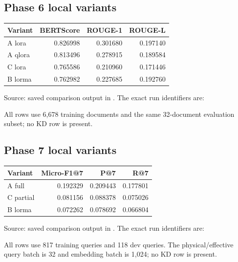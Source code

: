 \subsection{Phase 6 local variants}
\begin{table}[H]\centering\small
\begin{tabular}{lrrr}
\toprule Variant & BERTScore & ROUGE-1 & ROUGE-L\\\midrule
A lora & 0.826998 & 0.301680 & 0.197140\\
A qlora & 0.813496 & 0.278915 & 0.189584\\
C lora & 0.765586 & 0.210960 & 0.171446\\
B lorma & 0.762982 & 0.227685 & 0.192760\\
\bottomrule\end{tabular}
\end{table}
Source: saved comparison output in . The exact run identifiers are:
\par\noindent\small{}\normalsize
\par\noindent\small{}\normalsize
\par\noindent\small{}\normalsize
\par\noindent\small{}\normalsize
All rows use 6,678 training documents and the same 32-document evaluation subset; no KD row is present.
\subsection{Phase 7 local variants}
\begin{table}[H]\centering\small
\begin{tabular}{lrrr}
\toprule Variant & Micro-F1@7 & P@7 & R@7\\\midrule
A full & 0.192329 & 0.209443 & 0.177801\\
C partial & 0.081156 & 0.088378 & 0.075026\\
B lorma & 0.072262 & 0.078692 & 0.066804\\
\bottomrule\end{tabular}
\end{table}
Source: saved comparison output in . The exact run identifiers are:
\par\noindent\small{}\normalsize
\par\noindent\small{}\normalsize
\par\noindent\small{}\normalsize
All rows use 817 training queries and 118 dev queries. The physical/effective query batch is 32 and embedding batch is 1,024; no KD row is present.
